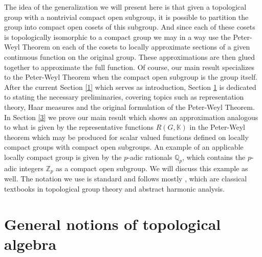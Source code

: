 \documentclass{amsart}
\theoremstyle{definition}
\numberwithin{equation}{section}
\newcommand{\rgk}{R(G,\mathbb{K})}
\begin{document}
The idea of the generalization we will present here is that given a topological group with a nontrivial compact open subgroup, it is possible to partition the group into compact open cosets of this subgroup. And since each of these cosets is topologically isomorphic to a compact group we may in a way use the Peter-Weyl Theorem on each of the cosets to locally approximate sections of a given continuous function on the original group. These approximations are then glued together to approximate the full function. Of course, our main result specializes to the Peter-Weyl Theorem when the compact open subgroup is the group itself.  After the current Section \ref{1} which serves as introduction, Section \ref{2} is dedicated to stating the necessary preliminaries, covering topics such as representation theory, Haar measures and the original formulation of the Peter-Weyl Theorem. 
In Section \ref{3} we prove our main result which shows an approximation analogous to what is given by the representative functions $\rgk$ in the Peter-Weyl theorem  which may be produced for scalar valued functions defined on locally compact groups with compact open subgroups. An example of an applicable locally compact group is given by the $p$-adic rationals $\mathbb{Q}_p$, which contains the $p$-adic integers $\mathbb{Z}_p$ as a compact open subgroup. We will discuss this example as well.
The notation we use is standard and follows mostly \cite{HHR, HewittRoss, hilgertneeb,  hm, hofmann, stroppel}, which are classical textbooks in topological group theory and abstract harmonic analysis. 

\section{General notions of topological algebra}\label{2}
\end{document}
